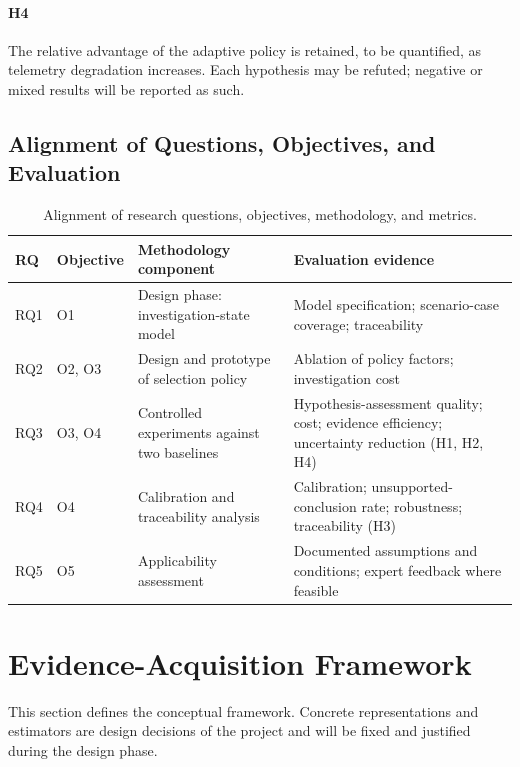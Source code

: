 \documentclass[a4paper,11pt,oneside]{article}
\begin{document}
\paragraph{H4} The relative advantage of the adaptive policy is retained, to be quantified, as
telemetry degradation increases. Each hypothesis may be refuted; negative or mixed results will be reported as such.
\subsection{Alignment of Questions, Objectives, and Evaluation}
\begin{table}[htbp]
\centering
\caption{Alignment of research questions, objectives, methodology, and metrics.}
\label{tab:alignment}
\small
\begin{tabularx}{\textwidth}{@{}p{}p{}p{}X@{}}
\toprule
\textbf{RQ} & \textbf{Objective} & \textbf{Methodology component} & \textbf{Evaluation evidence} \\
\midrule
RQ1 & O1 & Design phase: investigation-state model & Model specification; scenario-case coverage; traceability \\
RQ2 & O2, O3 & Design and prototype of selection policy & Ablation of policy factors; investigation cost \\
RQ3 & O3, O4 & Controlled experiments against two baselines & Hypothesis-assessment quality; cost; evidence efficiency; uncertainty reduction (H1, H2, H4) \\
RQ4 & O4 & Calibration and traceability analysis & Calibration; unsupported-conclusion rate; robustness; traceability (H3) \\
RQ5 & O5 & Applicability assessment & Documented assumptions and conditions; expert feedback where feasible \\
\bottomrule
\end{tabularx}
\end{table}
\section{Evidence-Acquisition Framework}
This section defines the conceptual framework. Concrete representations and estimators are design decisions of the project and will be fixed and justified during the design phase.
\end{document}

